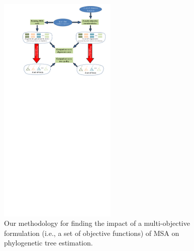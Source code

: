 \begin{figure}[!htbp]
	\centering
	\includegraphics[width=0.5\textwidth]{Figure/pipeline}
	\caption{Our methodology for finding the impact of a multi-objective formulation (i.e., a set of objective functions) of MSA on phylogenetic tree estimation.} 
	\label{fig:pipeline}
\end{figure}

